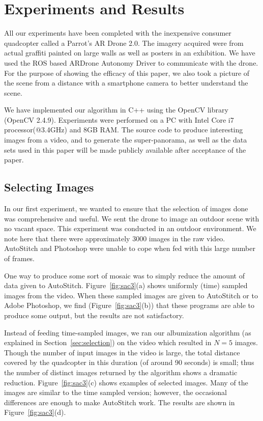 \setlength{\tabcolsep}{2pt}
\section{Experiments and Results}
\label{sec:results}

All our experiments have been completed with the inexpensive consumer
quadcopter called a Parrot's AR Drone 2.0. The imagery acquired were
from actual graffiti painted on large walls as well as posters in an
exhibition.  We have used the ROS based ARDrone Autonomy
Driver to communicate with the drone. For the purpose of showing the
efficacy of this paper, we also took a picture of the scene from a
distance with a smartphone camera to better understand the scene.

We have implemented our algorithm in C++ using the OpenCV library
(OpenCV 2.4.9). Experiments were performed on a PC with Intel Core i7
processor(@3.4GHz) and 8GB RAM.  The source code to produce
interesting images from a video, and to generate the super-panorama,
as well as the data sets used in this paper will be made publicly
available after acceptance of the paper.

\subsection{Selecting Images}

In our first experiment, we wanted to ensure that the selection of
images done was comprehensive and useful.  We sent the drone to image 
an outdoor scene with no vacant space. This experiment was conducted
in an outdoor environment. We note here that there were approximately
3000 images in the raw video.  AutoStitch and Photoshop were unable to 
cope  when fed with this large number of frames.

One way to produce some sort of mosaic was to simply reduce the amount
of data given to AutoStitch.  Figure~\ref{fig:sac3}(a) shows uniformly
(time) sampled images from the video.  When these sampled images are
given to AutoStitch or to Adobe Photoshop, we find
(Figure~\ref{fig:sac3}(b)) that these programs are able to produce
some output, but the results are not satisfactory.

Instead of feeding time-sampled images, we ran our albumization
algorithm (as explained in Section~\ref{sec:selection}) on the video
which resulted in $N = 5$ images.  Though the number of input images
in the video is large, the total distance covered by the quadcopter in
this duration (of around 90 seconds) is small; thus the
number of distinct images returned by the algorithm shows a dramatic
reduction. Figure~\ref{fig:sac3}(c) shows examples of selected images.
Many of the images are similar to the time sampled version; however,
the occasional differences are enough to make AutoStitch work. The
results are shown in Figure~\ref{fig:sac3}(d).


